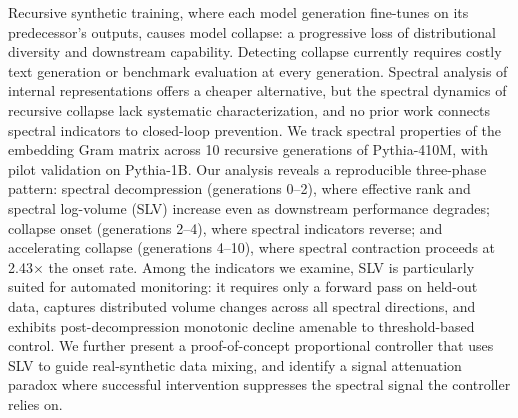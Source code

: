 Recursive synthetic training, where each model generation fine-tunes on its predecessor's outputs, causes model collapse: a progressive loss of distributional diversity and downstream capability.
Detecting collapse currently requires costly text generation or benchmark evaluation at every generation.
Spectral analysis of internal representations offers a cheaper alternative, but the spectral dynamics of recursive collapse lack systematic characterization, and no prior work connects spectral indicators to closed-loop prevention.
We track spectral properties of the embedding Gram matrix across 10 recursive generations of Pythia-410M, with pilot validation on Pythia-1B.
Our analysis reveals a reproducible three-phase pattern: spectral decompression (generations 0--2), where effective rank and spectral log-volume (SLV) increase even as downstream performance degrades; collapse onset (generations 2--4), where spectral indicators reverse; and accelerating collapse (generations 4--10), where spectral contraction proceeds at 2.43$\times$ the onset rate.
Among the indicators we examine, SLV is particularly suited for automated monitoring: it requires only a forward pass on held-out data, captures distributed volume changes across all spectral directions, and exhibits post-decompression monotonic decline amenable to threshold-based control.
We further present a proof-of-concept proportional controller that uses SLV to guide real-synthetic data mixing, and identify a signal attenuation paradox where successful intervention suppresses the spectral signal the controller relies on.